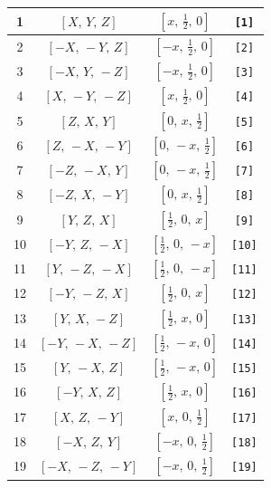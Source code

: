 \documentclass[fleqn,8pt]{jsarticle}
\begin{document}
\begin{longtable}{cccc}
1 & $\left[ X,\, Y,\, Z \right]$ & $\left[ x,\, \frac{1}{2},\, 0 \right]$ & {\tt [1]} \\ \hline
2 & $\left[ - X,\, - Y,\, Z \right]$ & $\left[ - x,\, \frac{1}{2},\, 0 \right]$ & {\tt [2]} \\ \hline
3 & $\left[ - X,\, Y,\, - Z \right]$ & $\left[ - x,\, \frac{1}{2},\, 0 \right]$ & {\tt [3]} \\ \hline
4 & $\left[ X,\, - Y,\, - Z \right]$ & $\left[ x,\, \frac{1}{2},\, 0 \right]$ & {\tt [4]} \\ \hline
5 & $\left[ Z,\, X,\, Y \right]$ & $\left[ 0,\, x,\, \frac{1}{2} \right]$ & {\tt [5]} \\ \hline
6 & $\left[ Z,\, - X,\, - Y \right]$ & $\left[ 0,\, - x,\, \frac{1}{2} \right]$ & {\tt [6]} \\ \hline
7 & $\left[ - Z,\, - X,\, Y \right]$ & $\left[ 0,\, - x,\, \frac{1}{2} \right]$ & {\tt [7]} \\ \hline
8 & $\left[ - Z,\, X,\, - Y \right]$ & $\left[ 0,\, x,\, \frac{1}{2} \right]$ & {\tt [8]} \\ \hline
9 & $\left[ Y,\, Z,\, X \right]$ & $\left[ \frac{1}{2},\, 0,\, x \right]$ & {\tt [9]} \\ \hline
10 & $\left[ - Y,\, Z,\, - X \right]$ & $\left[ \frac{1}{2},\, 0,\, - x \right]$ & {\tt [10]} \\ \hline
11 & $\left[ Y,\, - Z,\, - X \right]$ & $\left[ \frac{1}{2},\, 0,\, - x \right]$ & {\tt [11]} \\ \hline
12 & $\left[ - Y,\, - Z,\, X \right]$ & $\left[ \frac{1}{2},\, 0,\, x \right]$ & {\tt [12]} \\ \hline
13 & $\left[ Y,\, X,\, - Z \right]$ & $\left[ \frac{1}{2},\, x,\, 0 \right]$ & {\tt [13]} \\ \hline
14 & $\left[ - Y,\, - X,\, - Z \right]$ & $\left[ \frac{1}{2},\, - x,\, 0 \right]$ & {\tt [14]} \\ \hline
15 & $\left[ Y,\, - X,\, Z \right]$ & $\left[ \frac{1}{2},\, - x,\, 0 \right]$ & {\tt [15]} \\ \hline
16 & $\left[ - Y,\, X,\, Z \right]$ & $\left[ \frac{1}{2},\, x,\, 0 \right]$ & {\tt [16]} \\ \hline
17 & $\left[ X,\, Z,\, - Y \right]$ & $\left[ x,\, 0,\, \frac{1}{2} \right]$ & {\tt [17]} \\ \hline
18 & $\left[ - X,\, Z,\, Y \right]$ & $\left[ - x,\, 0,\, \frac{1}{2} \right]$ & {\tt [18]} \\ \hline
19 & $\left[ - X,\, - Z,\, - Y \right]$ & $\left[ - x,\, 0,\, \frac{1}{2} \right]$ & {\tt [19]} \\ \hline

\end{longtable}
\end{document}
